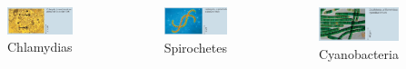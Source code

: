 \documentclass[ignorenonframetext,aspectratio=169]{beamer}
\begin{document}
\begin{frame}{}
\protect\hypertarget{section-8}{}

\begin{columns}[T,onlytextwidth]

\begin{figure}
\includegraphics[width=0.9\linewidth]{./../images/bacteria_chlamydias} \caption{Chlamydias}\label{fig:chlamydias}
\end{figure}


\begin{figure}
\includegraphics[width=0.9\linewidth]{./../images/bacteria_spirochetes} \caption{Spirochetes}\label{fig:spirochetes}
\end{figure}
  

\begin{figure}
\includegraphics[width=0.9\linewidth]{./../images/bacteria_cyano} \caption{Cyanobacteria}\label{fig:cyanobacteria}
\end{figure}
  
\end{columns}

\end{frame}
\end{document}
